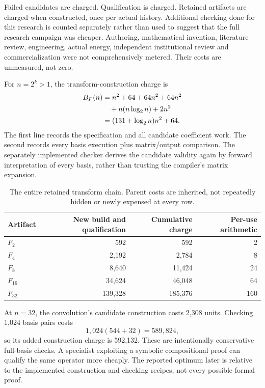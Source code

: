 \documentclass[11pt,letterpaper]{article}
\theoremstyle{definition}\newtheorem{definition}[theorem]{Definition}
\theoremstyle{remark}\newtheorem{remark}[theorem]{Remark}
\begin{document}
Failed candidates are charged. Qualification is charged. Retained artifacts are charged when constructed, once per actual history. Additional checking done for this research is counted separately rather than used to suggest that the full research campaign was cheaper. Authoring, mathematical invention, literature review, engineering, actual energy, independent institutional review and commercialization were not comprehensively metered. Their costs are unmeasured, not zero.

For $n=2^k>1$, the transform-construction charge is
\begin{align}
 B_F(n)&=n^2+64+64n^2+64n^2\notag\\
       &\quad+n(n\log_2n)+2n^2\notag\\
       &=(131+\log_2n)n^2+64.
 \label{eq:buildF}
\end{align}
The first line records the specification and all candidate coefficient work. The second records every basis execution plus matrix/output comparison. The separately implemented checker derives the candidate validity again by forward interpretation of every basis, rather than trusting the compiler's matrix expansion.

\begin{table}[htbp]\centering\small
\caption{The entire retained transform chain. Parent costs are inherited, not repeatedly hidden or newly expensed at every row.}
\begin{tabular}{@{}lrrr@{}}\toprule
Artifact & New build and qualification & Cumulative charge & Per-use arithmetic\\\midrule
$F_2$ & 592 & 592 & 2\\
$F_4$ & 2,192 & 2,784 & 8\\
$F_8$ & 8,640 & 11,424 & 24\\
$F_{16}$ & 34,624 & 46,048 & 64\\
$F_{32}$ & 139,328 & 185,376 & 160\\\bottomrule
\end{tabular}
\label{tab:chain}
\end{table}

At $n=32$, the convolution's candidate construction costs 2,308 units. Checking 1,024 basis pairs costs
\begin{equation}
 1{,}024(544+32)=589{,}824,
\end{equation}
so its added construction charge is 592,132. These are intentionally conservative full-basis checks. A specialist exploiting a symbolic compositional proof can qualify the same operator more cheaply. The reported optimum later is relative to the implemented construction and checking recipes, not every possible formal proof.
\end{document}
